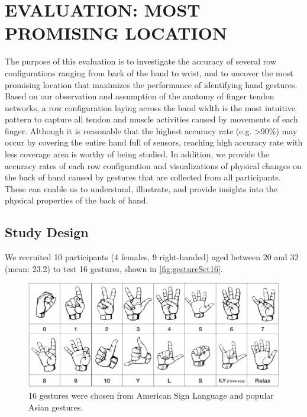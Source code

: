\documentclass{sigchi}
\begin{document}
\section{EVALUATION: MOST PROMISING LOCATION}

The purpose of this evaluation is to investigate the accuracy of several row configurations ranging from back of the hand to wrist, and to uncover the most promising location that maximizes the performance of identifying hand gestures. Based on our observation and assumption of the anatomy of finger tendon networks, a row configuration laying across the hand width is the most intuitive pattern to capture all tendon and muscle activities caused by movements of each finger. Although it is reasonable that the highest accuracy rate (e.g. \textgreater90\%) may occur by covering the entire hand full of sensors, reaching high accuracy rate with less coverage area is worthy of being studied.
In addition, we provide the accuracy rates of each row configuration and visualizations of physical changes on the back of hand caused by gestures that are collected from all participants. These can enable us to understand, illustrate, and provide insights into the physical properties of the back of hand. %

\subsection{Study Design}
We recruited 10 participants (4 females, 9 right-handed) aged between 20 and 32 (mean: 23.2) to test 16 gestures, shown in \autoref{fig:gestureSet16}.

\begin{figure}[b]
  \begin{center}
  \includegraphics[width=1\columnwidth]{figures/gestureSet_16_v3.pdf}
  \caption{16 gestures were chosen from American Sign Language and popular Asian gestures.}
  \label{fig:gestureSet16}
  \end{center}
\end{figure}
\end{document}
